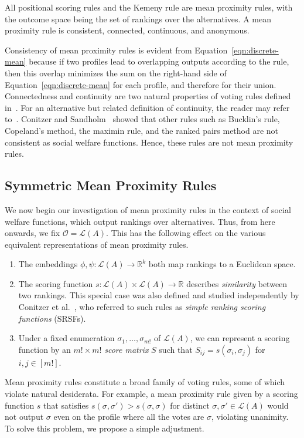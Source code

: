 \documentclass[prodmode]{acmsmall-ec14}
\newcommand{\calL}{{\mathcal{L}}}
\newcommand{\rank}{{\calL(A)}}
\newcommand{\calO}{{\mathcal{O}}}
\newcommand{\kibitz}[2]{\ifnum\Comments=1\textcolor{#1}{#2}\fi}
\newcommand{\ns}[1]{\kibitz{red} {[NS: #1]}}
\begin{document}
\begin{proposition}
All positional scoring rules and the Kemeny rule are mean proximity rules, with the outcome space being the set of rankings over the alternatives. A mean proximity rule is consistent, connected, continuous, and anonymous.
\label{prop:properties}
\end{proposition}
%
Consistency of mean proximity rules is evident from Equation~\eqref{eqn:discrete-mean} because if two profiles lead to overlapping outputs according to the rule, then this overlap minimizes the sum on the right-hand side of Equation~\eqref{eqn:discrete-mean} for each profile, and therefore for their union. Connectedness and continuity are two natural properties of voting rules defined in~\cite{Zwicker08a}. For an alternative but related definition of continuity, the reader may refer to~\cite{CRX09}. Conitzer and Sandholm~ showed that other rules such as Bucklin's rule, Copeland's method, the maximin rule, and the ranked pairs method are not consistent as social welfare functions. Hence, these rules are not mean proximity rules. 


\subsection{Symmetric Mean Proximity Rules}
\label{sec:symm}

We now begin our investigation of mean proximity rules in the context of social welfare functions, which output rankings over alternatives. Thus, from here onwards, we fix $\calO = \rank$. This has the following effect on the various equivalent representations of mean proximity rules.
\begin{enumerate}
\item The embeddings $\phi,\psi : \rank \to \mathbb{R}^k$ both map rankings to a Euclidean space. 
\item The scoring function $s : \rank \times \rank \rightarrow \mathbb{R}$ describes \emph{similarity} between two rankings. This special case was also defined and studied independently by Conitzer et al.~, who referred to such rules as \emph{simple ranking scoring functions} (SRSFs). 
\item Under a fixed enumeration $\sigma_1,\ldots,\sigma_{m!}$ of $\rank$, we can represent a scoring function by an $m! \times m!$ \emph{score matrix} $S$ such that $S_{ij} = s(\sigma_i,\sigma_j)$ for $i,j \in [m!]$.
\end{enumerate}
%
Mean proximity rules constitute a broad family of voting rules, some of which violate natural desiderata. For example, a mean proximity rule given by a scoring function $s$ that satisfies $s(\sigma,\sigma') > s(\sigma,\sigma)$ for distinct $\sigma,\sigma' \in \rank$ would not output $\sigma$ even on the profile where all the votes are $\sigma$, violating unanimity. To solve this problem, we propose a simple adjustment. 
\end{document}

